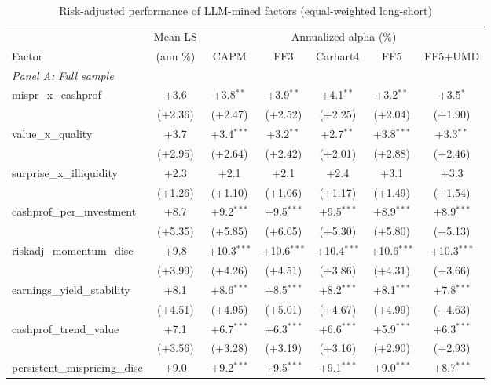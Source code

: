 \begin{table}[htbp]\centering
\caption{Risk-adjusted performance of LLM-mined factors (equal-weighted long-short)}
\label{tab:alphas_ew}
\begin{threeparttable}\footnotesize
\begin{tabular}{lcccccc}
\toprule
 & Mean LS & \multicolumn{5}{c}{Annualized alpha (\%)} \\
\cmidrule(lr){3-7}
Factor & (ann \%) & CAPM & FF3 & Carhart4 & FF5 & FF5+UMD \\
\midrule
\multicolumn{7}{l}{\textit{Panel A: Full sample}} \\
\addlinespace
mispr\_x\_cashprof & +3.6 & +3.8$^{**}$ & +3.9$^{**}$ & +4.1$^{**}$ & +3.2$^{**}$ & +3.5$^{*}$ \\
 & (+2.36) & (+2.47) & (+2.52) & (+2.25) & (+2.04) & (+1.90) \\
\addlinespace
value\_x\_quality & +3.7 & +3.4$^{***}$ & +3.2$^{**}$ & +2.7$^{**}$ & +3.8$^{***}$ & +3.3$^{**}$ \\
 & (+2.95) & (+2.64) & (+2.42) & (+2.01) & (+2.88) & (+2.46) \\
\addlinespace
surprise\_x\_illiquidity & +2.3 & +2.1 & +2.1 & +2.4 & +3.1 & +3.3 \\
 & (+1.26) & (+1.10) & (+1.06) & (+1.17) & (+1.49) & (+1.54) \\
\addlinespace
cashprof\_per\_investment & +8.7 & +9.2$^{***}$ & +9.5$^{***}$ & +9.5$^{***}$ & +8.9$^{***}$ & +8.9$^{***}$ \\
 & (+5.35) & (+5.85) & (+6.05) & (+5.30) & (+5.80) & (+5.13) \\
\addlinespace
riskadj\_momentum\_disc & +9.8 & +10.3$^{***}$ & +10.6$^{***}$ & +10.4$^{***}$ & +10.6$^{***}$ & +10.3$^{***}$ \\
 & (+3.99) & (+4.26) & (+4.51) & (+3.86) & (+4.31) & (+3.66) \\
\addlinespace
earnings\_yield\_stability & +8.1 & +8.6$^{***}$ & +8.5$^{***}$ & +8.2$^{***}$ & +8.1$^{***}$ & +7.8$^{***}$ \\
 & (+4.51) & (+4.95) & (+5.01) & (+4.67) & (+4.99) & (+4.63) \\
\addlinespace
cashprof\_trend\_value & +7.1 & +6.7$^{***}$ & +6.3$^{***}$ & +6.6$^{***}$ & +5.9$^{***}$ & +6.3$^{***}$ \\
 & (+3.56) & (+3.28) & (+3.19) & (+3.16) & (+2.90) & (+2.93) \\
\addlinespace
persistent\_mispricing\_disc & +9.0 & +9.2$^{***}$ & +9.5$^{***}$ & +9.1$^{***}$ & +9.0$^{***}$ & +8.7$^{***}$ \\

\end{tabular}
\end{threeparttable}
\end{table}
